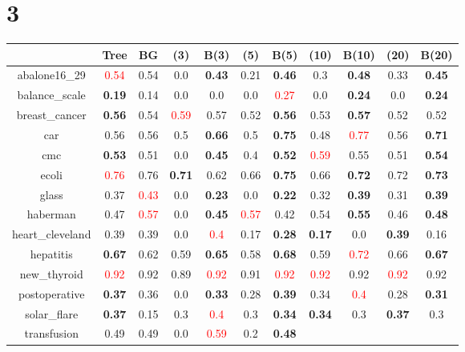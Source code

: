 \documentclass{article}%
\begin{document}
\section*{3}%
\begin{tabular}{c|cccccccccc}%
\hline%
&Tree&BG&(3)&B(3)&(5)&B(5)&(10)&B(10)&(20)&B(20)\\%
\hline%
abalone16\_29&\textcolor{red}{ 
0.54
}&0.54&0.0&\textbf{0.43}&0.21&\textbf{0.46}&0.3&\textbf{0.48}&0.33&\textbf{0.45}\\%
\hline%
balance\_scale&\textbf{0.19}&0.14&0.0&0.0&0.0&\textcolor{red}{ 
0.27
}&0.0&\textbf{0.24}&0.0&\textbf{0.24}\\%
\hline%
breast\_cancer&\textbf{0.56}&0.54&\textcolor{red}{ 
0.59
}&0.57&0.52&\textbf{0.56}&0.53&\textbf{0.57}&0.52&0.52\\%
\hline%
car&0.56&0.56&0.5&\textbf{0.66}&0.5&\textbf{0.75}&0.48&\textcolor{red}{ 
0.77
}&0.56&\textbf{0.71}\\%
\hline%
cmc&\textbf{0.53}&0.51&0.0&\textbf{0.45}&0.4&\textbf{0.52}&\textcolor{red}{ 
0.59
}&0.55&0.51&\textbf{0.54}\\%
\hline%
ecoli&\textcolor{red}{ 
0.76
}&0.76&\textbf{0.71}&0.62&0.66&\textbf{0.75}&0.66&\textbf{0.72}&0.72&\textbf{0.73}\\%
\hline%
glass&0.37&\textcolor{red}{ 
0.43
}&0.0&\textbf{0.23}&0.0&\textbf{0.22}&0.32&\textbf{0.39}&0.31&\textbf{0.39}\\%
\hline%
haberman&0.47&\textcolor{red}{ 
0.57
}&0.0&\textbf{0.45}&\textcolor{red}{ 
0.57
}&0.42&0.54&\textbf{0.55}&0.46&\textbf{0.48}\\%
\hline%
heart\_cleveland&0.39&0.39&0.0&\textcolor{red}{ 
0.4
}&0.17&\textbf{0.28}&\textbf{0.17}&0.0&\textbf{0.39}&0.16\\%
\hline%
hepatitis&\textbf{0.67}&0.62&0.59&\textbf{0.65}&0.58&\textbf{0.68}&0.59&\textcolor{red}{ 
0.72
}&0.66&\textbf{0.67}\\%
\hline%
new\_thyroid&\textcolor{red}{ 
0.92
}&0.92&0.89&\textcolor{red}{ 
0.92
}&0.91&\textcolor{red}{ 
0.92
}&\textcolor{red}{ 
0.92
}&0.92&\textcolor{red}{ 
0.92
}&0.92\\%
\hline%
postoperative&\textbf{0.37}&0.36&0.0&\textbf{0.33}&0.28&\textbf{0.39}&0.34&\textcolor{red}{ 
0.4
}&0.28&\textbf{0.31}\\%
\hline%
solar\_flare&\textbf{0.37}&0.15&0.3&\textcolor{red}{ 
0.4
}&0.3&\textbf{0.34}&\textbf{0.34}&0.3&\textbf{0.37}&0.3\\%
\hline%
transfusion&0.49&0.49&0.0&\textcolor{red}{ 
0.59
}&0.2&\textbf{0.48}&\textcolor{red}{ 
}
\end{tabular}
\end{document}
